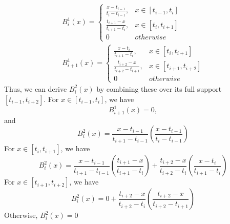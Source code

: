 \documentclass[a4paper]{article}
\begin{document}
\begin{align}
  B_i^1(x)=\begin{cases}
    \frac{x-t_{i-1}}{t_i-t_{i-1}},& x\in[t_{i-1},t_i]\\
    \frac{t_{i+1}-x}{t_{i+1}-t_i}, & x\in[t_i,t_{i+1}]\\
    0 & otherwise
  \end{cases}\\
  B_{i+1}^1(x)=\begin{cases}
    \frac{x-t_i}{t_{i+1}-t_i},&x\in[t_i,t_{i+1}]\\
    \frac{t_{i+2}-x}{t_{i+2}-t_{i+1}},& x\in[t_{i+1},t_{i+2}]\\
    0 &otherwise
  \end{cases}
\end{align}
Thus, we can derive $B_i^2(x)$ by combining these over its full support $[t_{i-1},t_{i+2}]$.\newline
For $x\in[t_{i-1},t_i]$, we have 
\begin{equation}
  B_{i+1}^1(x)=0,   
\end{equation}
and
\begin{equation}
  B_{i}^2(x)=\frac{x-t_{i-1}}{t_{i+1}-t_{i-1}}(\frac{x-t_{i-1}}{t_i-t_{i-1}}) \label{eq:26}
\end{equation}
For $x\in[t_i,t_{i+1}]$, we have
\begin{equation}
  B_i^2(x)=\frac{x-t_{i-1}}{t_{i+1}-t_{i-1}}(\frac{t_{i+1}-x}{t_{i+1}-t_{i}})+\frac{t_{i+2}-x}{t_{i+2}-t_i}(\frac{x-t_i}{t_{i+1}-t_i}) \label{eq:27}
\end{equation}
For $x\in [t_{i+1},t_{i+2}]$, we have
\begin{equation}
  B_i^2(x)=0+\frac{t_{i+2}-x}{t_{i+2}-t_i}(\frac{t_{i+2}-x}{t_{i+2}-t_{i+1}}) \label{eq:28}
\end{equation}
Otherwise, $B_i^2(x)=0$
\end{document}

